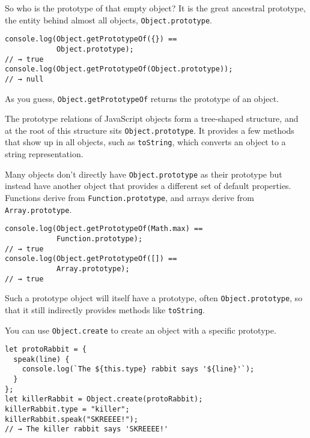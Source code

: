 So who is the prototype of that empty object? It is the great ancestral prototype, the entity behind almost all objects, \lstinline`Object.prototype`.

\begin{lstlisting}
console.log(Object.getPrototypeOf({}) ==
            Object.prototype);
// → true
console.log(Object.getPrototypeOf(Object.prototype));
// → null
\end{lstlisting}
\noindent{}

As you guess, \lstinline`Object.getPrototypeOf` returns the prototype of an object.

The prototype relations of JavaScript objects form a tree-shaped structure, and at the root of this structure sits \lstinline`Object.prototype`. It provides a few methods that show up in all objects, such as \lstinline`toString`, which converts an object to a string representation.

Many objects don't directly have \lstinline`Object.prototype` as their prototype but instead have another object that provides a different set of default properties. Functions derive from \lstinline`Function.prototype`, and arrays derive from \lstinline`Array.prototype`.

\begin{lstlisting}
console.log(Object.getPrototypeOf(Math.max) ==
            Function.prototype);
// → true
console.log(Object.getPrototypeOf([]) ==
            Array.prototype);
// → true
\end{lstlisting}
\noindent{}

Such a prototype object will itself have a prototype, often \lstinline`Object.prototype`, so that it still indirectly provides methods like \lstinline`toString`.

You can use \lstinline`Object.create` to create an object with a specific prototype.

\begin{lstlisting}
let protoRabbit = {
  speak(line) {
    console.log(`The ${this.type} rabbit says '${line}'`);
  }
};
let killerRabbit = Object.create(protoRabbit);
killerRabbit.type = "killer";
killerRabbit.speak("SKREEEE!");
// → The killer rabbit says 'SKREEEE!'
\end{lstlisting}
\noindent{}


